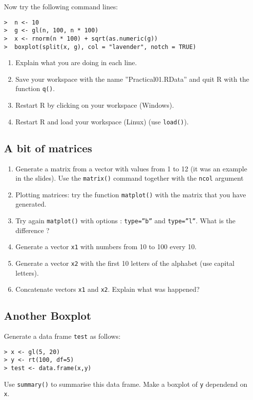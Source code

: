\documentclass[12pt]{article}
\begin{document}
Now try the following command lines:
\begin{verbatim}
>  n <- 10
>  g <- gl(n, 100, n * 100)
>  x <- rnorm(n * 100) + sqrt(as.numeric(g))
>  boxplot(split(x, g), col = "lavender", notch = TRUE)
\end{verbatim}
\begin{enumerate}
\item Explain what you are doing in each line.
\item Save your workspace with the name ''Practical01.RData'' and quit R with the function \texttt{q()}.
\item Restart R by clicking on your workspace (Windows).
\item Restart R and load your workspace (Linux) (use \texttt{load()}).
\end{enumerate}


\subsection{A bit of matrices}

\begin{enumerate}
\item Generate a matrix from a vector with values from 1 to 12 (it was an example in the slides). Use the \texttt{matrix()} command together with the \texttt{ncol} argument
\item Plotting matrices: try the function \texttt{matplot()} with the matrix that you have generated.
\item Try again \texttt{matplot()}  with options :  \texttt{type=''b''} and \texttt{type=''l''}.
 What is the difference ?
\item Generate a vector \texttt{x1} with numbers from 10 to 100 every 10.
\item Generate a vector \texttt{x2} with the first 10 letters of the alphabet (use capital letters).
\item Concatenate vectors \texttt{x1} and \texttt{x2}. Explain what was happened?
\end{enumerate}


\subsection{Another Boxplot}
Generate a data frame \texttt{test} as follows:
\begin{verbatim}
> x <- gl(5, 20)
> y <- rt(100, df=5)
> test <- data.frame(x,y)
\end{verbatim}
Use \texttt{summary()} to summarise this data frame. Make a boxplot of \texttt{y} dependend on \texttt{x}.
\end{document}
